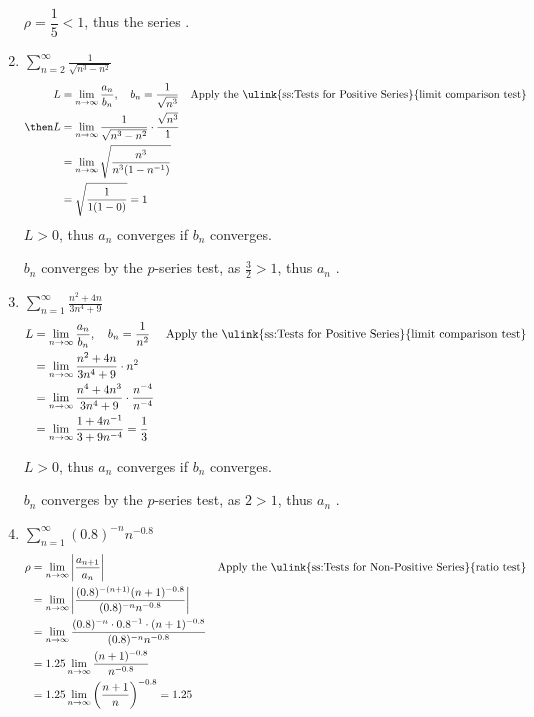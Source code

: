 \begin{enumerate}[itemsep=12em]
  \(\rho = \dfrac{1}{5} < 1\), thus the series .


  \item \(\displaystyle \sum_{n=2}^{\infty} \frac{1}{\sqrt{n^3 - n^2}} \)
    \begin{align*}
      L &= \lim_{n \to \infty} \frac{a_n}{b_n}, \quad b_n = \frac{1}{\sqrt{n^3} }
      && \text{Apply the \ulink{ss:Tests for Positive Series}{limit comparison test}} \\
      \then L &= \lim_{n \to \infty} \frac{1}{\sqrt{n^3 - n^2}}
      \cdot \frac{\sqrt{n^3}}{1} \\
      &= \lim_{n \to \infty} \sqrt{\frac{n^3}{n^3(1-n ^{-1})}} \\
      &= \sqrt{\frac{1}{1(1-0)}} = 1
    \end{align*}
    \(L > 0\), thus \(a_n\) converges if \(b_n\) converges.

    \(b_n\) converges by the \(p\)-series test, as \(\frac{3}{2} > 1\), thus
    \(a_n\) .


  \item \(\displaystyle \sum_{n=1}^{\infty} \frac{n^2 + 4n}{3n^4 + 9} \)
    \begin{align*}
      L &= \lim_{n \to \infty} \frac{a_n}{b_n}, \quad b_n = \frac{1}{n^2}
      && \text{Apply the \ulink{ss:Tests for Positive Series}{limit comparison test}} \\
      &= \lim_{n \to \infty} \frac{n^2 + 4n}{3n^4 + 9} \cdot n^2 \\
      &= \lim_{n \to \infty} \frac{n^4 + 4n^3}{3n^4 + 9} \cdot \frac{n^{-4}}{n^{-4}} \\
      &= \lim_{n \to \infty} \frac{1 + 4n^{-1}}{3 + 9n^{-4}} = \frac{1}{3}
    \end{align*}

    \(L > 0\), thus \(a_n\) converges if \(b_n\) converges.

    \(b_n\) converges by the \(p\)-series test, as \(2 > 1\), thus
    \(a_n\) .

  \item \(\displaystyle \sum_{n=1}^{\infty} (0.8)^{-n} n^{-0.8}  \)
    \begin{align*}
      \rho &= \lim_{n \to \infty} \left| \frac{a_{n+1}}{a_n}  \right|
     && \text{Apply the \ulink{ss:Tests for Non-Positive Series}{ratio test}} \\
     &= \lim_{n \to \infty}
     \left|  \frac{(0.8)^{-(n+1)} (n+1)^{-0.8}}{(0.8)^{-n} n^{-0.8}} \right| \\
     &= \lim_{n \to \infty}
     \frac{(0.8)^{-n} \cdot 0.8^{-1} \cdot (n+1)^{-0.8}}{(0.8)^{-n} n^{-0.8}} \\
     &= 1.25 \lim_{n \to \infty}
     \frac{(n+1)^{-0.8}}{n^{-0.8}} \\
     &= 1.25 \lim_{n \to \infty}
     \left(\frac{n+1}{n}\right)^{-0.8} = 1.25
    \end{align*}


\end{enumerate}
